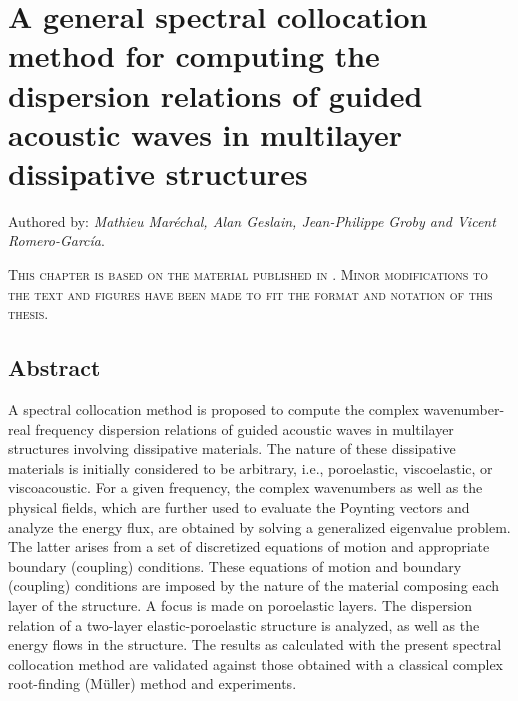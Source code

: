 \chapter{A general spectral collocation method for computing the dispersion relations of guided acoustic waves in multilayer dissipative structures}
Authored by: \textit{Mathieu Maréchal, Alan Geslain, Jean-Philippe Groby and Vicent Romero-Garc\'ia}. 

\begin{center}
    {\color{gray}\textsc{This chapter is based on the material published in \cite{marechal2025}. Minor modifications to the text and figures have been made to fit the format and notation of this thesis.}}
\end{center}

\section{Abstract}
A spectral collocation method is proposed to compute the complex wavenumber-real frequency dispersion relations of guided acoustic waves in multilayer structures involving dissipative materials. The nature of these dissipative materials is initially considered to be arbitrary, i.e., poroelastic, viscoelastic, or viscoacoustic. For a given frequency, the complex wavenumbers as well as the physical fields, which are further used to evaluate the Poynting vectors and analyze the energy flux, are obtained by solving a generalized eigenvalue problem. The latter arises from a set of discretized equations of motion and appropriate boundary (coupling) conditions. These equations of motion and boundary (coupling) conditions are imposed by the nature of the material composing each layer of the structure. A focus is made on poroelastic layers. The dispersion relation of a two-layer elastic-poroelastic structure is analyzed, as well as the energy flows in the structure. The results as calculated with the present spectral collocation method are validated against those obtained with a classical complex root-finding (M\"uller) method and experiments.



